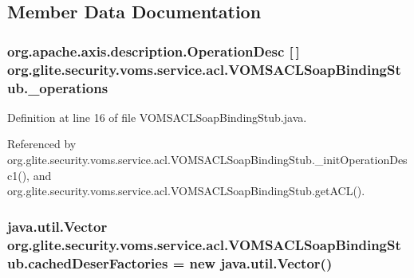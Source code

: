 \subsection{Member Data Documentation}
\hypertarget{classorg_1_1glite_1_1security_1_1voms_1_1service_1_1acl_1_1VOMSACLSoapBindingStub_a62f5bc542d4ef6fe5ac95163e7ccb066}{
\subsubsection[{\_\-operations}]{\setlength{\rightskip}{0pt plus 5cm}org.apache.axis.description.OperationDesc \mbox{[}$\,$\mbox{]} {\bf org.glite.security.voms.service.acl.VOMSACLSoapBindingStub.\_\-operations}}}
\label{classorg_1_1glite_1_1security_1_1voms_1_1service_1_1acl_1_1VOMSACLSoapBindingStub_a62f5bc542d4ef6fe5ac95163e7ccb066}


Definition at line 16 of file VOMSACLSoapBindingStub.java.



Referenced by org.glite.security.voms.service.acl.VOMSACLSoapBindingStub.\_\-initOperationDesc1(), and org.glite.security.voms.service.acl.VOMSACLSoapBindingStub.getACL().

\hypertarget{classorg_1_1glite_1_1security_1_1voms_1_1service_1_1acl_1_1VOMSACLSoapBindingStub_ad2a0f0464874ed1a4f61fd2226c64342}{
\subsubsection[{cachedDeserFactories}]{\setlength{\rightskip}{0pt plus 5cm}java.util.Vector {\bf org.glite.security.voms.service.acl.VOMSACLSoapBindingStub.cachedDeserFactories} = new java.util.Vector()}}
\label{classorg_1_1glite_1_1security_1_1voms_1_1service_1_1acl_1_1VOMSACLSoapBindingStub_ad2a0f0464874ed1a4f61fd2226c64342}


